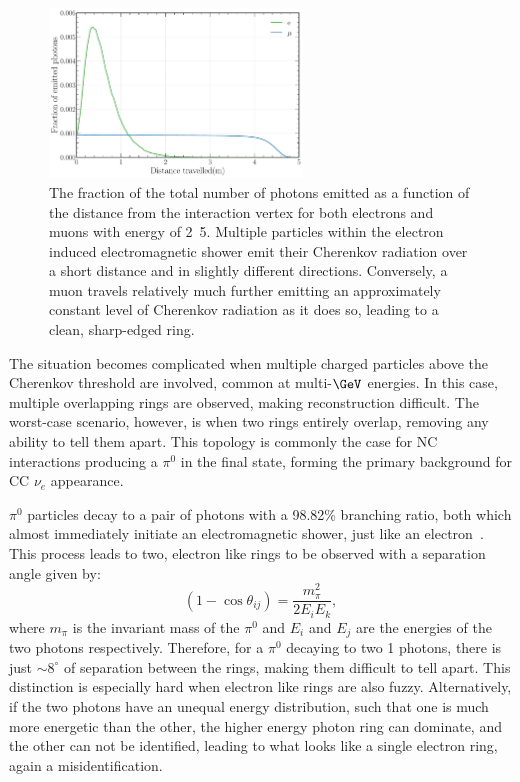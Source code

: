 \begin{figure} %
    \includegraphics[width=0.6\textwidth]{diagrams/4-chips/emission_distance.pdf}
    \caption[Fraction of Cherenkov photons emitted as a function of distance.]
    {The fraction of the total number of photons emitted as a function of the distance from the
        interaction vertex for both electrons and muons with energy of \unit{2.5}{\GeV}. Multiple
        particles within the electron induced electromagnetic shower emit their Cherenkov
        radiation over a short distance and in slightly different directions. Conversely, a muon
        travels relatively much further emitting an approximately constant level of Cherenkov
        radiation as it does so, leading to a clean, sharp-edged ring.}
    \label{fig:emission distance}
\end{figure}

The situation becomes complicated when multiple charged particles above the Cherenkov threshold
are involved, common at multi-$\GeV$ energies. In this case, multiple overlapping rings are
observed, making reconstruction difficult. The worst-case scenario, however, is when two rings
entirely overlap, removing any ability to tell them apart. This topology is commonly the case for
NC interactions producing a $\pi^{0}$ in the final state, forming the primary background for CC
$\nu_{e}$ appearance.

$\pi^{0}$ particles decay to a pair of photons with a 98.82\% branching ratio, both which almost
immediately initiate an electromagnetic shower, just like an electron~\cite{particle2020}. This
process leads to two, electron like rings to be observed with a separation angle given by:
\begin{equation}
    (1-\cos\theta_{ij})=\frac{m_{\pi}^2}{2E_{i}E_{k}},
\end{equation}
where $m_{\pi}$ is the invariant mass of the $\pi^{0}$ and $E_{i}$ and $E_{j}$ are the energies of
the two photons respectively. Therefore, for a $\pi^{0}$ decaying to two \unit{1}{\GeV} photons,
there is just $\sim 8^{\circ}$ of separation between the rings, making them difficult to tell
apart. This distinction is especially hard when electron like rings are also fuzzy. Alternatively,
if the two photons have an unequal energy distribution, such that one is much more energetic than
the other, the higher energy photon ring can dominate, and the other can not be identified,
leading to what looks like a single electron ring, again a misidentification.

